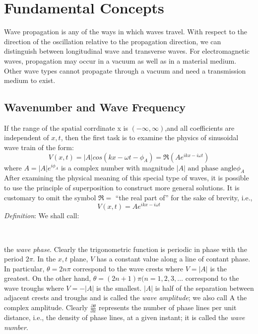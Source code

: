 \section {Fundamental Concepts}
Wave propagation is any of the ways in which waves travel.
With respect to the direction of the oscillation relative to the propagation direction, we can distinguish between longitudinal wave and transverse waves.
For electromagnetic waves, propagation may occur in a vacuum as well as in a material medium. Other wave types cannot propagate through a vacuum and need a transmission medium to exist.\cite{wiki:wp}

\subsection*{Wavenumber and Wave Frequency \cite{mitocwwp}}	
If the range of the spatial corrdinate x is $(-\infty,\infty)$,and all coefficients are independent of $x,t$,  then the first task is to examine the physics
of sinusoidal wave train of the form:\\
\[V(x,t) = |A|cos(kx - \omega t - \phi_A)=\mathfrak{R}(A e^{ikx-i\omega t})\]
where $A = |A| e^{i \phi_A}$ is a complex number with magnitude $|A|\text{ and phase angle} \phi_A$ After
examining the physical meaning of this special type of waves, it is possible to use the
principle of superposition to construct more general solutions. It is customary to omit
the symbol $\mathfrak{R} = $ ``the real part of''  for the sake of brevity, i.e.,\\
\[V(x,t) = Ae^{ikx-i\omega t}\]
\emph{Definition}: We shall call:\\
\begin{center}
\\
\end{center}
the \emph{wave phase}. Clearly the trigonometric function is periodic in phase with the period $2 \pi$. In the $x,t$ plane, $V$ has a constant value along a line of contant phase. In particular, $\theta = 2n \pi$ correspond to the wave crests where $V = |A|$ is the greatest.
On the other hand, $\theta = (2n+1) \pi (n=1,2,3,\ldots$ correspond to the wave troughs where $V = -|A|$ is the smallest. $|A|$ is half of the separation between adjacent crests
and troughs and is called the \emph{wave amplitude}; we also call A the complex amplitude. Clearly $\frac{\partial \theta}{\partial x}$ represents the number of phase lines per unit distance, i.e., the density of
phase lines, at a given instant; it is called the \emph{wave number}.\\

